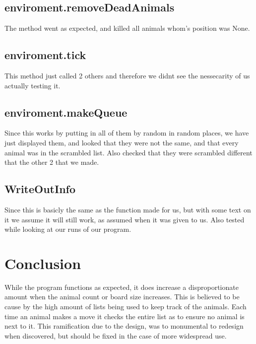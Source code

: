 \documentclass{article}
\begin{document}
    \subsection{enviroment.removeDeadAnimals}
    The method went as expected, and killed all animals whom's position was None.
    
    \subsection{enviroment.tick}
    This method just called 2 others and therefore we didnt see the nessecarity of us actually testing it.
    
    \subsection{enviroment.makeQueue}
    Since this works by putting in all of them by random in random places, we have just displayed them, and looked that they were not the same, and that every animal was in the scrambled list. Also checked that they were scrambled different that the other 2 that we made.
    
    \subsection{WriteOutInfo}
    Since this is basicly the same as the function made for us, but with some text on it we assume it will still work, as assumed when it was given to us. Also tested while looking at our runs of our program.
    
    \section{Conclusion}
     While the program functions as expected, it does increase a disproportionate amount when the animal count or board size increases. This is believed to be cause by the high amount of lists being used to keep track of the animals. Each time an animal makes a move it checks the entire list as to ensure no animal is next to it. This ramification due to the design, was to monumental to redesign when discovered, but should be fixed in the case of more widespread use. 
\end{document}
